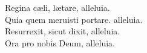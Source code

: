 
Regina c\ae li, l\ae tare, alleluia.\\
Quia quem meruisti portare. alleluia.\\ 
Resurrexit, sicut dixit, alleluia.\\ 
Ora pro nobis Deum, alleluia.